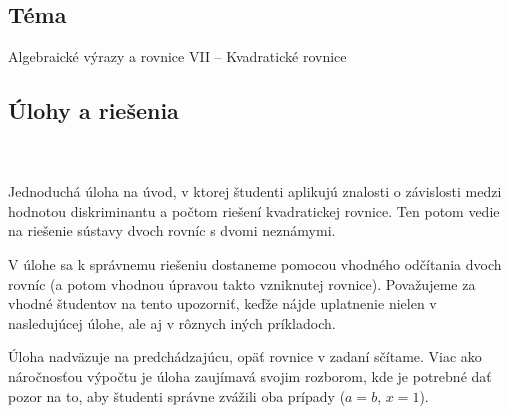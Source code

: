
\subsection*{Téma}
Algebraické výrazy a rovnice VII -- Kvadratické rovnice


\subsection*{Úlohy a riešenia}



\\
\\
\kom Jednoduchá úloha na úvod, v ktorej študenti aplikujú znalosti o závislosti medzi hodnotou diskriminantu a počtom riešení kvadratickej rovnice. Ten potom vedie na riešenie sústavy dvoch rovníc s dvomi neznámymi.



\kom V úlohe sa k správnemu riešeniu dostaneme pomocou vhodného odčítania dvoch rovníc (a potom vhodnou úpravou takto vzniknutej rovnice). Považujeme za vhodné študentov na tento  upozorniť, keďže nájde uplatnenie nielen v nasledujúcej úlohe, ale aj v rôznych iných príkladoch.



\kom Úloha nadväzuje na predchádzajúcu, opäť rovnice v zadaní sčítame. Viac ako náročnosťou výpočtu je úloha zaujímavá svojim rozborom, kde je potrebné dať pozor na to, aby študenti správne zvážili oba prípady ($a=b$, $x=1$).

